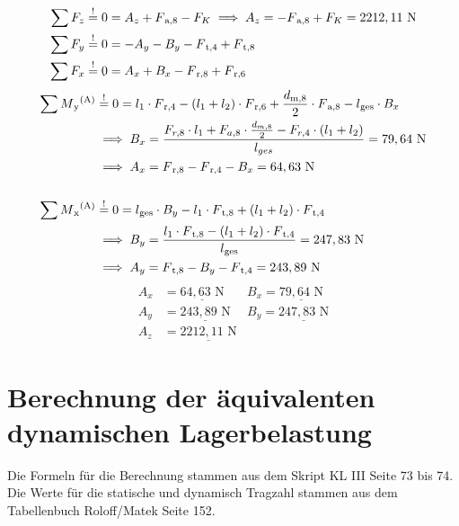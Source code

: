 \begin{itemize}
	\begin{align*}
	\sum F_z &\overset{!}{=} 0 = A_z + F\textsubscript{a,8} - F_K \implies A_z = - F\textsubscript{a,8} + F_K = 2212,11 \text{ N}\\ 
	\sum F_y &\overset{!}{=} 0 = -A_y- B_y - F\textsubscript{t,4} + F\textsubscript{t,8}\\ 
	\sum F_x &\overset{!}{=} 0 = A_x + B_x - F\textsubscript{r,8} + F\textsubscript{r,6}\\ 
	\end{align*}
	\begin{align*}
	\sum M\textsubscript{y}\textsuperscript{(A)} &\overset{!}{=} 0 =  l_1 \cdot F\textsubscript{r,4} - (l_1+l_2) \cdot F\textsubscript{r,6}+ \frac{d\textsubscript{m,8} }{2}\cdot F\textsubscript{a,8}- l\textsubscript{ges} \cdot B_x\\ 
	&\implies B_x = \frac{F_{r,8} \cdot l_1 + F_{a,8}\cdot \frac{d_{m,8}}{2}-F_{r,4}\cdot (l_1 + l_2)}{l_{ges}} = 79,64 \text { N} \\ 
	& \implies A_x = F\textsubscript{r,8} - F\textsubscript{r,4} - B_x = 64,63 \text{ N}\\ \\
	\sum M\textsubscript{x}\textsuperscript{(A)} &\overset{!}{=} 0 = l\textsubscript{ges} \cdot B_y - l_1 \cdot F\textsubscript{t,8} + (l_1+l_2) \cdot F\textsubscript{t,4} \\ 
	&\implies B_y = \frac{l_1\cdot F\textsubscript{t,8} - (l_1+l_2) \cdot F\textsubscript{t,4}}{l\textsubscript{ges}} = 247,83 \text{ N}\\ 
	& \implies A_y =   F\textsubscript{t,8}-B_y- F\textsubscript{t,4} =  243,89\text{ N}\\ 
	\end{align*}
	\begin{align*}
	A_x &= \underline{64,63\text{ N}} & B_x= \underline{79,64\text{ N}}\\
	A_y &= \underline{243,89\text{ N}} & B_y= \underline{247,83\text{ N}}\\
	A_z &= \underline{2212,11\text{ N}}
	\end{align*}
\end{itemize}
\newpage
\section{Berechnung der äquivalenten dynamischen Lagerbelastung}
Die Formeln für die Berechnung stammen aus dem Skript KL III Seite 73 bis 74.
Die Werte für die statische und dynamisch Tragzahl stammen aus dem Tabellenbuch Roloff/Matek  Seite 152.

